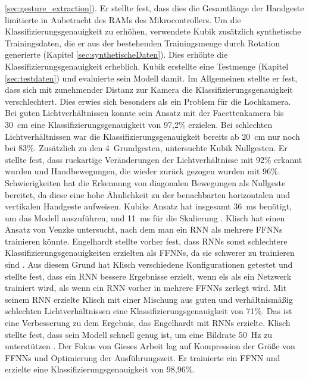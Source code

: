 \ref{sec:gesture_extraction}). Er stellte fest, dass dies die Gesamtlänge der Handgeste limitierte in Anbetracht des RAMs des Mikrocontrollers. Um die Klassifizierungsgenauigkeit zu erhöhen, verwendete Kubik zusätzlich
synthetische Trainingsdaten, die er aus der bestehenden Trainingsmenge durch Rotation generierte (Kapitel \ref{sec:synthetischeDaten}). Dies erhöhte die Klassifizierungsgenauigkeit erheblich. Kubik erstellte eine Testmenge
(Kapitel \ref{sec:testdaten}) und evaluierte sein Modell damit. Im Allgemeinen stellte er fest, dass sich mit zunehmender Distanz zur Kamera die Klassifizierungsgenauigkeit verschlechtert. Dies erwies sich besonders als ein
Problem für die Lochkamera. Bei guten Lichtverhältnissen konnte sein Ansatz mit der Facettenkamera bis 30~cm eine Klassifizierungsgenauigkeit von 97,2\% erzielen. Bei schlechten Lichtverhältnissen war die Klassifizierungsgenauigkeit
bereits ab 20~cm nur noch bei 83\%. Zusätzlich zu den 4~Grundgesten, untersuchte Kubik Nullgesten. Er stellte fest, dass ruckartige Veränderungen der Lichtverhältnisse mit 92\% erkannt wurden und Handbewegungen, die wieder
zurück gezogen wurden mit 96\%. Schwierigkeiten hat die Erkennung von diagonalen Bewegungen als Nullgeste bereitet, da diese eine hohe Ähnlichkeit zu der benachbarten horizontalen und vertikalen Handgeste aufweisen. Kubiks Ansatz
hat insgesamt 36~ms benötigt, um das Modell auszuführen, und 11~ms für die Skalierung \cite{kubikThesis}.
\newline
\newline
Klisch hat einen Ansatz von Venzke untersucht, nach dem man ein RNN als mehrere FFNNs trainieren könnte. Engelhardt stellte vorher fest, dass RNNs sonst schlechtere
Klassifizierungsgenauigkeiten erzielten als FFNNs, da sie schwerer zu trainieren sind \cite{engelhardtThesis}. Aus diesem Grund hat Klisch verschiedene Konfigurationen getestet und stellte fest,
dass ein RNN bessere Ergebnisse erzielt, wenn els als ein Netzwerk trainiert wird, als wenn ein RNN vorher in mehrere FFNNs zerlegt wird. Mit seinem RNN erzielte Klisch mit einer Mischung aus guten und
verhältnismäßig schlechten Lichtverhältnissen eine Klassifizierungsgenauigkeit von 71\%. Das ist eine Verbesserung zu dem Ergebnis, das Engelhardt mit RNNs erzielte.
Klisch stellte fest, dass sein Modell schnell genug ist, um eine Bildrate 50~Hz zu unterstützen \cite{klischThesis}.
\newline
\newline
Der Fokus von Gieses Arbeit lag auf Kompression der Größe von FFNNs und Optimierung der Ausführungszeit. Er trainierte ein FFNN und erzielte eine Klassifizierungsgenauigkeit von 98,96\%.
